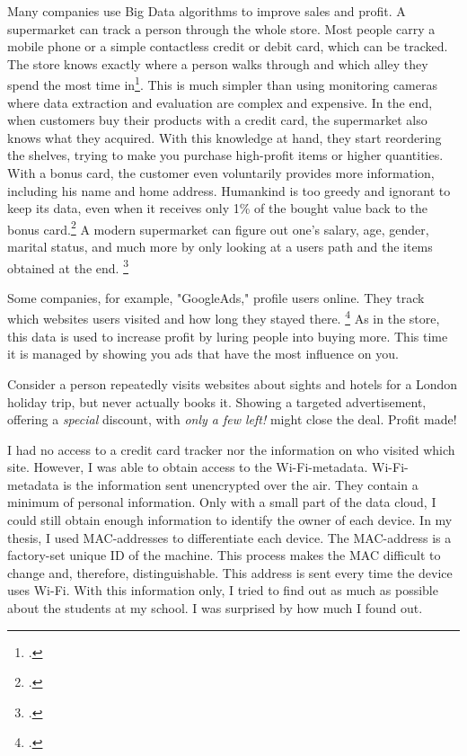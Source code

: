 \documentclass[paper=a4, fontsize=11pt]{article}
\begin{document}
Many companies use Big Data algorithms to improve sales and profit. A supermarket can track a person through the whole store.
Most people carry a mobile phone or a simple contactless credit or debit card, which can be tracked. The store knows exactly where a person walks through and which alley they spend the most time in\footcite{supermarkettracking}. This is much simpler than using monitoring cameras where data extraction and evaluation are complex and expensive. In the end, when customers buy their products with a credit card, the supermarket also knows what they acquired. With this knowledge at hand, they start reordering the shelves, trying to make you purchase high-profit items or higher quantities. With a bonus card, the customer even voluntarily provides more information, including his name and home address. Humankind is too greedy and ignorant to keep its data, even when it receives only 1\% of the bought value back to the bonus card.\footcite{supermarketpoints} A modern supermarket can figure out one's salary, age, gender, marital status, and much more by only looking at a users path and the items obtained at the end. \footcite{supermarketbigdata}

Some companies, for example, "GoogleAds," profile users online. They track which websites users visited and how long they stayed there. \footcite{googleadshow} As in the store, this data is used to increase profit by luring people into buying more. This time it is managed by showing you ads that have the most influence on you. 

Consider a person repeatedly visits websites about sights and hotels for a London holiday trip, but never actually books it. Showing a targeted advertisement, offering a \emph{special} discount, with \emph{only a few left!} might close the deal. Profit made!

I had no access to a credit card tracker nor the information on who visited which site. However, I was able to obtain access to the Wi-Fi-metadata. Wi-Fi-metadata is the information sent unencrypted over the air. They contain a minimum of personal information. Only with a small part of the data cloud, I could still obtain enough information to identify the owner of each device. In my thesis, I used MAC-addresses to differentiate each device. The MAC-address is a factory-set unique ID of the machine. This process makes the MAC difficult to change and, therefore, distinguishable. This address is sent every time the device uses Wi-Fi. With this information only, I tried to find out as much as possible about the students at my school. I was surprised by how much I found out.
\end{document}
